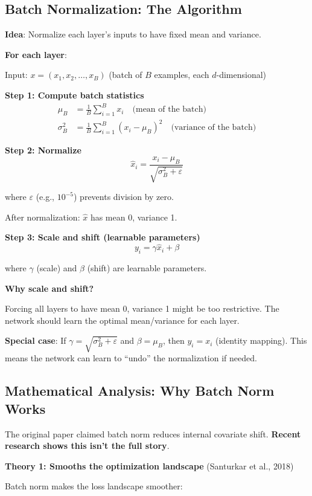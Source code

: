 \subsection{Batch Normalization: The Algorithm}

\textbf{Idea}: Normalize each layer's inputs to have fixed mean and variance.

\textbf{For each layer}:

Input: $x = (x_1, x_2, \ldots, x_B)$ (batch of $B$ examples, each $d$-dimensional)

\textbf{Step 1: Compute batch statistics}
\begin{align*}
\mu_B &= \frac{1}{B} \sum_{i=1}^B x_i \quad \text{(mean of the batch)} \\
\sigma_B^2 &= \frac{1}{B} \sum_{i=1}^B (x_i - \mu_B)^2 \quad \text{(variance of the batch)}
\end{align*}

\textbf{Step 2: Normalize}
\[
\hat{x}_i = \frac{x_i - \mu_B}{\sqrt{\sigma_B^2 + \varepsilon}}
\]

where $\varepsilon$ (e.g., $10^{-5}$) prevents division by zero.

After normalization: $\hat{x}$ has mean 0, variance 1.

\textbf{Step 3: Scale and shift (learnable parameters)}
\[
y_i = \gamma \hat{x}_i + \beta
\]

where $\gamma$ (scale) and $\beta$ (shift) are learnable parameters.

\textbf{Why scale and shift?}

Forcing all layers to have mean 0, variance 1 might be too restrictive. The network should learn the optimal mean/variance for each layer.

\textbf{Special case}: If $\gamma = \sqrt{\sigma_B^2 + \varepsilon}$ and $\beta = \mu_B$, then $y_i = x_i$ (identity mapping). This means the network can learn to ``undo'' the normalization if needed.

\subsection{Mathematical Analysis: Why Batch Norm Works}

The original paper claimed batch norm reduces internal covariate shift. \textbf{Recent research shows this isn't the full story}.

\textbf{Theory 1: Smooths the optimization landscape} (Santurkar et al., 2018)

Batch norm makes the loss landscape smoother:

